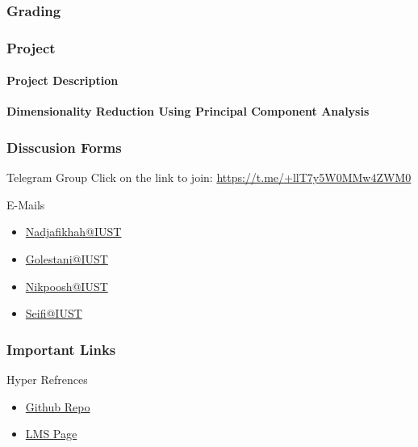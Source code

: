 \documentclass{beamer}
\begin{document}
\begin{frame}
  \frametitle{Grading}
\end{frame}

\begin{frame}
  \frametitle{Project}
  \framesubtitle{Project Description}
  \textbf{Dimensionality Reduction Using Principal Component Analysis}\\
  
\end{frame}

\begin{frame}
  \frametitle{Disscusion Forms}
\begin{block}{Telegram Group}
  Click on the link to join: \hyperlink{Group Link}{https://t.me/+llT7y5W0MMw4ZWM0}
\end{block}
  
\begin{block}{E-Mails}
  \begin{itemize}
    \item \href{mailto:golestani_ali@mathdep.iust.ac.ir}{Nadjafikhah@IUST}
    \item \href{mailto:golestani_ali@mathdep.iust.ac.ir}{Golestani@IUST}
    \item \href{mailto:golestani_ali@mathdep.iust.ac.ir}{Nikpoosh@IUST}
    \item \href{mailto:nargess_seifi@mathdep.iust.ac.ir}{Seifi@IUST}
  \end{itemize}
\end{block}
\end{frame}

\begin{frame}
  \frametitle{Important Links}
\begin{alertblock}{Hyper Refrences}
  \begin{itemize}
    \item \href{https://github.com/golestani-ali/LinAlg-4001-2}{Github Repo}
    \item \href{URL}{LMS Page}
  \end{itemize}
\end{alertblock}
\end{frame}
\end{document}
